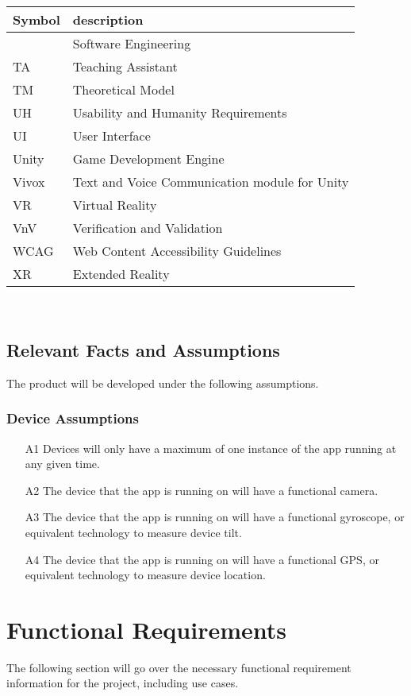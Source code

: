 \documentclass[12pt]{article}
\begin{document}
\renewcommand{\arraystretch}{1.2}
\begin{tabular}{l l} 
  \toprule		
  \textbf{Symbol} & \textbf{description}\\
  \midrule 
  \progname{} & Software Engineering\\
  TA & Teaching Assistant\\
  TM & Theoretical Model\\
  UH & Usability and Humanity Requirements\\
  UI & User Interface\\
  Unity & Game Development Engine\\
  Vivox & Text and Voice Communication module for Unity\\
  VR & Virtual Reality\\
  VnV & Verification and Validation \\
  WCAG & Web Content Accessibility Guidelines \\
  XR & Extended Reality\\
  \bottomrule
\end{tabular}\\

\subsection{Relevant Facts and Assumptions}
The product will be developed under the following assumptions.

\subsubsection{Device Assumptions}
\begin{itemize}
    \item [A1] Devices will only have a maximum of one instance of the app running at any given time. 
    \item [A2] The device that the app is running on will have a functional camera. 
    \item [A3] The device that the app is running on will have a functional gyroscope, or equivalent technology to measure device tilt. 
    \item [A4] The device that the app is running on will have a functional GPS, or equivalent technology to measure device location. 
\end{itemize}

\section{Functional Requirements}
The following section will go over the necessary functional requirement information for the project, including use cases. 
\end{document}
